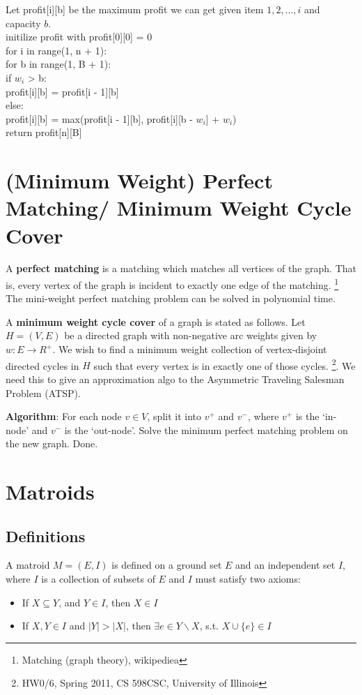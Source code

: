 \documentclass[11pt]{article}
\begin{document}
  \begin{algo}
    Let profit[i][b] be the maximum profit we can get given item $1, 2, ..., i$ and capacity $b$.\\
    initilize profit with profit[0][0] = 0\\
    for i in range(1, n + 1): \\
      for b in range(1, B + 1): \\
        if $w_i$ > b: \\
          profit[i][b] = profit[i - 1][b] \\
        else: \\
          profit[i][b] = max(profit[i - 1][b], profit[i][b - $w_i$] + $w_i$) \\
    return profit[n][B] 
  \end{algo}

\section{(Minimum Weight) Perfect Matching/ Minimum Weight Cycle Cover}
  A \textbf{perfect matching} is a matching which matches all vertices of the graph. That is, every vertex of the graph is incident to exactly one edge of the matching. \footnote{Matching (graph theory), wikipediea} The mini-weight perfect matching problem can be solved in polynomial time. 

  A \textbf{minimum weight cycle cover} of a graph is stated as follows. Let $H = (V, E)$ be a directed graph with non-negative arc weights given by $w: E \rightarrow R ^+$. We wish to find a minimum weight collection of vertex-disjoint directed cycles in $H$ such that every vertex is in exactly one of those cycles. \footnote{HW0/6, Spring 2011, CS 598CSC, University of Illinois}. We need this to give an approximation algo to the Asymmetric Traveling Salesman Problem (ATSP).

  \textbf{Algorithm}:
  For each node $v \in V$, split it into $v^+$ and $v^-$, where $v^+$ is the `in-node' and $v^-$ is the `out-node'. Solve the minimum perfect matching problem on the new graph. Done.

\section{Matroids}
  \subsection{Definitions}
    A matroid $M = (E, I)$ is defined on a ground set $E$ and an independent set $I$, where $I$ is a collection of subsets of $E$ and $I$ must satisfy two axioms:
    \begin{itemize}
      \item If $X \subseteq Y$, and $Y \in I$, then $X \in I$
      \item If $X, Y \in I$ and $|Y| > |X|$, then $\exists e \in Y\backslash X$, s.t. $X \cup \{e\} \in I$
    \end{itemize}
    
\end{document}
